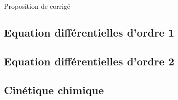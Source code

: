 
\vspace{0.1cm}
\begin{huge}
 Proposition de corrigé
\end{huge}

\subsection{Equation différentielles d'ordre 1}
\setcounter{thequestion}{0}
\subsection{Equation différentielles d'ordre 2}
\setcounter{thequestion}{0}
\subsection{Cinétique chimique}
\setcounter{thequestion}{0}
